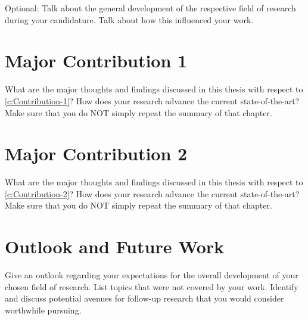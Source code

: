 
\noindent Optional: Talk about the general development of the respective field of research during your candidature. Talk about how this influenced your work.

\section{Major Contribution 1}

What are the major thoughts and findings discussed in this thesis with respect to \autoref{c:Contribution-1}? How does your research advance the current state-of-the-art? Make sure that you do NOT simply repeat the summary of that chapter.

\section{Major Contribution 2}

What are the major thoughts and findings discussed in this thesis with respect to \autoref{c:Contribution-2}? How does your research advance the current state-of-the-art? Make sure that you do NOT simply repeat the summary of that chapter.


\section{Outlook and Future Work}

Give an outlook regarding your expectations for the overall development of your chosen field of research. List topics that were not covered by your work. Identify and discuss potential avenues for follow-up research that you would consider worthwhile pursuing.